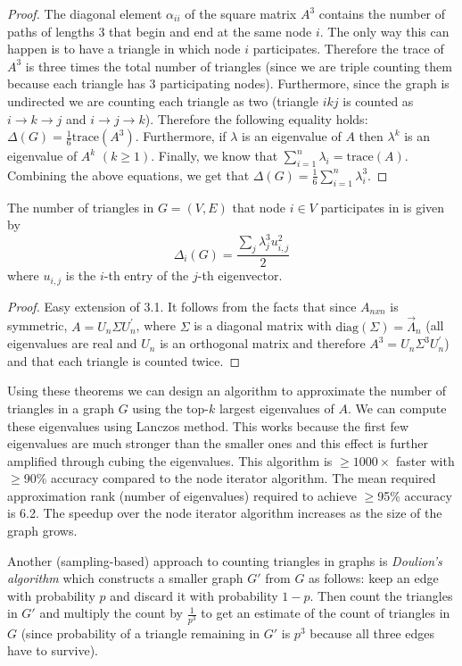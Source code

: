 \medskip

\begin{proof}
The diagonal element $\alpha_{ii}$ of the square matrix $A^3$ contains the number of paths of lengths 3 that begin and end at the same node $i$. The only way this can happen is to have a triangle in which node $i$ participates. Therefore the trace of $A^3$ is three times the total number of triangles (since we are triple counting them because each triangle has 3 participating nodes). Furthermore, since the graph is undirected we are counting each triangle as two (triangle $ikj$ is counted as $i \rightarrow k \rightarrow j$ and $i \rightarrow j \rightarrow k$). Therefore the following equality holds: $\Delta(G) = \frac{1}{6} \text{trace}(A^3)$. Furthermore, if $\lambda$ is an eigenvalue of $A$ then $\lambda^k$ is an eigenvalue of $A^k$ $(k \geq 1)$. Finally, we know that $\sum_{i=1}^n \lambda_i = \text{trace}(A)$. Combining the above equations, we get that $\Delta(G) = \frac{1}{6} \sum_{i=1}^n \lambda_i^3$.
\end{proof}

\bigskip

\begin{theorem}[EigenTriangleLocal]
The number of triangles in $G=(V,E)$ that node $i \in V$ participates in is given by
$$
\Delta_i(G) = \frac{\sum_j \lambda_j^3 u_{i,j}^2}{2}
$$
where $u_{i,j}$ is the $i$-th entry of the $j$-th eigenvector.
\end{theorem}

\medskip

\begin{proof}
Easy extension of 3.1. It follows from the facts that since $A_{nxn}$ is symmetric, $A = U_n \Sigma U_n^{'}$, where $\Sigma$ is a diagonal matrix with $\text{diag}(\Sigma) = \vec{\Lambda}_n$ (all eigenvalues are real and $U_n$ is an orthogonal matrix and therefore $A^3 = U_n \Sigma^3 U_n^{'}$) and that each triangle is counted twice.
\end{proof}

Using these theorems we can design an algorithm to approximate the number of triangles in a graph $G$ using the top-$k$ largest eigenvalues of $A$. We can compute these eigenvalues using Lanczos method. This works because the first few eigenvalues are much stronger than the smaller ones and this effect is further amplified through cubing the eigenvalues. This algorithm is $\geq 1000\times$ faster with $\geq$90\% accuracy compared to the node iterator algorithm. The mean required approximation rank (number of eigenvalues) required to achieve $\geq$95\% accuracy is 6.2. The speedup over the node iterator algorithm increases as the size of the graph grows.

Another (sampling-based) approach to counting triangles in graphs is \emph{Doulion's algorithm} which constructs a smaller graph $G'$ from $G$ as follows: keep an edge with probability $p$ and discard it with probability $1-p$. Then count the triangles in $G'$ and multiply the count by $\frac{1}{p^3}$ to get an estimate of the count of triangles in $G$ (since probability of a triangle remaining in $G'$ is $p^3$ because all three edges have to survive).

